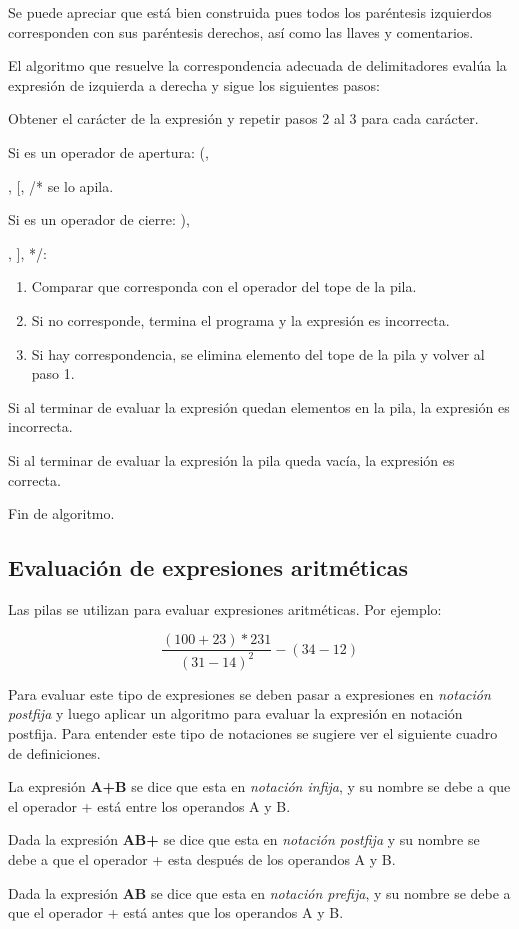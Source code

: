Se puede apreciar que está bien construida pues todos los paréntesis izquierdos corresponden con sus paréntesis derechos, así como las llaves y comentarios. 

El algoritmo que resuelve la correspondencia adecuada de delimitadores evalúa la expresión de izquierda a derecha y sigue los siguientes pasos: 

\begin{enumerate}
	
\item Obtener el carácter de la expresión y repetir pasos 2 al 3 para cada carácter.
\item Si es un operador de apertura:  (,  {, [, /*   se lo apila.
\item Si es un operador de cierre: ), }, ], */:
	\begin{enumerate}
		\item Comparar que corresponda con el operador del tope de la pila. 
		\item Si no corresponde, termina el programa y la expresión es incorrecta.
		\item Si hay correspondencia, se elimina elemento del tope de la pila y volver al paso 1.
\end{enumerate}	
\item Si al terminar de evaluar la expresión quedan elementos en la pila, la expresión es incorrecta.
\item Si al terminar de evaluar la expresión la pila queda vacía, la expresión es correcta. 
\item Fin de algoritmo.
\end{enumerate}	

\subsection{Evaluación de expresiones aritméticas}
Las pilas se utilizan para evaluar expresiones aritméticas. Por ejemplo:

\begin{equation*}
	\frac{(100+23)\ast 231}{(31-14)^2}-(34 - 12)
\end{equation*}


Para evaluar este tipo de expresiones se deben pasar a expresiones en \textit{notación postfija} y luego aplicar un algoritmo para evaluar la expresión en notación postfija. Para entender este tipo de notaciones se sugiere ver el siguiente cuadro de definiciones.

\begin{definicion}
La expresión  \textbf{A+B} se dice que esta en \textit{notación infija}, y su nombre se debe a que el operador + está entre los operandos A y B.

Dada la expresión \textbf{AB+} se dice que esta en \textit{notación postfija} y su nombre se debe a que el operador + esta después de los operandos A y B.

Dada la expresión \textbf{AB} se dice que esta en \textit{notación prefija}, y su nombre se debe a que el operador + está antes que los operandos A y B.

\end{definicion}

